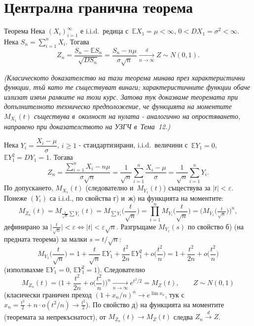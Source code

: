 \section{Централна гранична теорема}

\begin{thmbox}[~(ЦГТ)]{Теорема}
Нека $(X_i)_{i=1}^{\infty}$ е i.i.d.\ редица с~$\mathbb EX_1=\mu<
\infty$, $0<DX_1=\sigma^2<\infty$. Нека $S_n=\sum_{i=1}^n X_i$. Тогава
\[
  Z_n = \frac{S_n-\mathbb ES_n}{\sqrt{DS_n}} = \frac{S_n-n\mu}{\sigma\sqrt n} \xrightarrow[n\to\infty]{d} Z\sim N(0,1).
\]
\end{thmbox}

\begin{proofbox}
\emph{(Класическото доказателство на тази теорема минава през
характеристични функции, тъй като те съществуват винаги;
характеристичните функции обаче излизат извън рамките на този курс.
Затова тук доказваме теоремата при допълнителното техническо
предположение, че функцията на моментите $M_{X_1}(t)$ съществува в~околност на нулата - аналогично на опростяването, направено при
доказателството на УЗГЧ в~Тема~12.)}

Нека $Y_i=\dfrac{X_i-\mu}\sigma$, $i\ge1$ - стандартизирани, i.i.d.\
величини с~$\mathbb EY_1=0$, $\mathbb EY_1^2=DY_1=1$. Тогава
\[
  Z_n = \frac{\sum_{i=1}^n X_i-n\mu}{\sigma\sqrt n} = \frac1{\sqrt n}\sum_{i=1}^n\frac{X_i-\mu}\sigma = \frac1{\sqrt n}\sum_{i=1}^n Y_i.
\]
По допускането, $M_{X_1}(t)$ (следователно и~$M_{Y_1}(t)$)
съществува за $|t|<\varepsilon$. Понеже $(Y_i)$ са i.i.d., по
свойства г) и~ж) на функцията на моментите:
\[
  M_{Z_n}(t) = M_{\frac1{\sqrt n}\sum Y_i}(t) = M_{\sum Y_i}\Big(\frac t{\sqrt n}\Big) = \prod_{i=1}^n M_{Y_i}\Big(\frac t{\sqrt n}\Big) = \Big(M_{Y_1}\big(\tfrac t{\sqrt n}\big)\Big)^n,
\]
дефинирано за $\big|\tfrac t{\sqrt n}\big|<\varepsilon \iff |t|<
\varepsilon\sqrt n$. Разгръщаме $M_{Y_1}(s)$ по свойство б) (на
предната теорема) за малки $s=t/\sqrt n$:
\[
  M_{Y_1}\Big(\frac t{\sqrt n}\Big) = 1 + \frac{t}{\sqrt n}\,\mathbb EY_1 + \frac{t^2}{2n}\,\mathbb EY_1^2 + o\Big(\frac{t^2}n\Big) = 1+\frac{t^2}{2n}+o\Big(\frac{t^2}n\Big)
\]
(използвахме $\mathbb EY_1=0$, $\mathbb EY_1^2=1$). Следователно
\[
  M_{Z_n}(t) = \Big(1+\frac{t^2}{2n}+o\Big(\frac{t^2}n\Big)\Big)^{n} \xrightarrow[n\to\infty]{} e^{t^2/2} = M_Z(t), \qquad Z\sim N(0,1)
\]
(класически граничен преход $(1+x_n/n)^n\to e^{\lim x_n}$, тук с~$x_n=\tfrac{t^2}2+n\cdot o(t^2/n)\to\tfrac{t^2}2$). По свойство д) на
функцията на моментите (теоремата за непрекъснатост), от $M_{Z_n}(t)
\to M_Z(t)$ следва $Z_n\xrightarrow{d}Z$. \qedbg
\end{proofbox}


